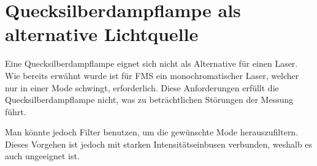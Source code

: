 
\section{Quecksilberdampflampe als alternative Lichtquelle}

Eine Quecksilberdampflampe eignet sich nicht als Alternative für einen Laser. Wie bereits erwähnt wurde ist für FMS ein monochromatischer Laser, welcher nur in einer Mode schwingt, erforderlich. Diese Anforderungen erfüllt die Quecksilberdampflampe nicht, was zu beträchtlichen Störungen der Messung führt.

Man könnte jedoch Filter benutzen, um die gewünschte Mode herauszufiltern. Dieses Vorgehen ist jedoch mit starken Intensitätseinbusen verbunden, weshalb es auch ungeeignet ist.